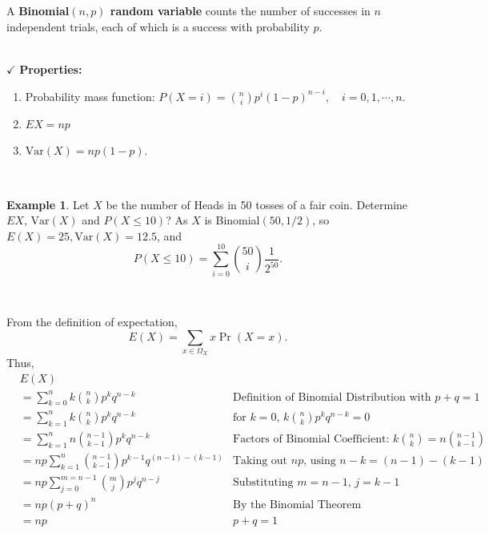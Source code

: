 \documentclass[12pt,a4paper]{article}
\theoremstyle{definition}
\newtheorem{example}{Example}[section]
\theoremstyle{definition}
\theoremstyle{definition}
\theoremstyle{definition}
\theoremstyle{remark}
\theoremstyle{definition}
\newcommand{\dispsty}{\displaystyle}
\newcommand{\Var}{\text{Var}}
\begin{document}
\newpage
\begin{tcolorbox}[colback=white]
	A \textbf{Binomial$(n,p)$ random variable} counts the number of successes in $n$ independent trials, each of which is a success with probability $p$.
\end{tcolorbox}\
\\
$\checkmark$ \textbf{Properties:}\begin{enumerate}
	\item Probability mass function: $\dispsty P(X=i)=\binom{n}{i}p^i(1-p)^{n-i},\quad i=0,1,\cdots, n$.
	\item $EX=np$
	\item $\Var(X)=np(1-p)$.
\end{enumerate}
\
\begin{example}
	Let $X$ be the number of Heads in 50 tosses of a fair coin. Determine $EX$, $\Var(X)$ and $P(X\leq 10)$? As $X$ is Binomial$(50,1/2)$, so $E(X)=25, \Var(X)=12.5$, and \[
	P(X\leq 10)=\sum_{i=0}^10\binom{50}{i}\frac{1}{2^50}.
	\]
\end{example}
\
\begin{tcolorbox}[colback=white]
	From the definition of expectation, \[
	E(X)=\sum_{x\in\Omega_X}x\Pr(X=x).
	\]
	Thus, \begin{align*}
	&E(X)\\
	&=\sum_{k=0}^{n}k\binom{n}{k}p^kq^{n-k} &\text{Definition of Binomial Distribution with $p+q=1$}\\
	&=\sum_{k=1}^nk\binom{n}{k}p^kq^{n-k} &\text{for $k=0$, $k\binom{n}{k}p^kq^{n-k}=0$}\\
	&=\sum_{k=1}^nn\binom{n-1}{k-1}p^kq^{n-k} &\text{Factors of Binomial Coefficient: $k\binom{n}{k}=n\binom{n-1}{k-1}$}\\
	&=np\sum_{k=1}^n\binom{n-1}{k-1}p^{k-1}q^{(n-1)-(k-1)} &\text{Taking out $np$, using $n-k=(n-1)-(k-1)$}\\
	&=np\sum_{j=0}^{m=n-1}\binom{m}{j}p^jq^{n-j} &\text{Substituting $m=n-1$, $j=k-1$}\\
	&=np(p+q)^n &\text{By the Binomial Theorem}\\
	&=np &p+q=1
	\end{align*}
\end{tcolorbox}
\
\end{document}
